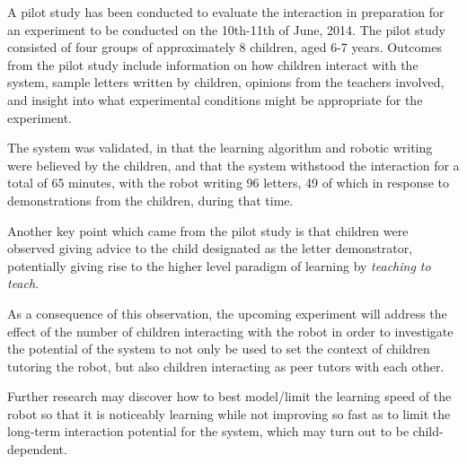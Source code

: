 \documentclass{sig-alternate}
\begin{document}
A pilot study has been conducted to evaluate the interaction in preparation for
an experiment to be conducted on the 10th-11th of June, 2014. The pilot study
consisted of four groups of approximately 8 children, aged 6-7 years. Outcomes
from the pilot study include information on how children interact with the
system, sample letters written by children, opinions from the teachers involved,
and insight into what experimental conditions might be appropriate for the
experiment. 

The system was validated, in that the learning algorithm and robotic writing
were believed by the children, and that the system withstood the interaction for
a total of 65 minutes, with the robot writing 96 letters, 49 of which in
response to demonstrations from the children, during that time. 

Another key point which came from the pilot study is that children were observed
giving advice to the child designated as the letter demonstrator, potentially
giving rise to the higher level paradigm of learning by \emph{teaching to
teach}. 

%
%
%
%

As a consequence of this observation, the upcoming experiment will address the
effect of the number of children interacting with the robot in order to
investigate the potential of the system to not only be used to set the context
of children tutoring the robot, but also children interacting as peer tutors
with each other.


Further research may discover how to best model/limit the learning speed of the
robot so that it is noticeably learning while not improving so fast as to limit
the long-term interaction potential for the system, which may turn out to be
child-dependent.
\end{document}
